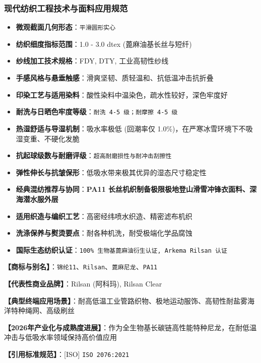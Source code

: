 \documentclass[11pt,openright,twoside,UTF8]{ctexbook}
\begin{document}
\subsubsection*{现代纺织工程技术与面料应用规范}
\begin{itemize} \setlength{\itemsep}{2pt}
    \item \textbf{微观截面几何形态}：\texttt{平滑圆形实心}
    \item \textbf{纺织细度指标范围}：1.0 - 3.0 dtex (蓖麻油基长丝与短纤)
    \item \textbf{纱线加工技术规格}：FDY, DTY, 工业高韧性纱线
    \item \textbf{手感风格与悬垂触感}：滑爽坚韧、质轻温和、抗低温冲击抗折叠
    \item \textbf{印染工艺与适用染料}：酸性染料中温染色，疏水性较好，深色牢度好
    \item \textbf{耐洗与日晒色牢度等级}：\texttt{耐洗 4-5 级；耐摩擦 4-5 级}
    \item \textbf{热湿舒适与导湿机制}：吸水率极低 (回潮率仅 1.0\%)，在严寒冰雪环境下不吸湿变重、不硬化发脆
    \item \textbf{抗起球级数与耐磨评级}：\texttt{超高耐磨损性与耐冲击刮擦性}
    \item \textbf{弹性伸长与抗皱保形}：低吸水带来极其优异的湿态尺寸稳定性
    \item \textbf{经典混纺推荐与协同}：\textbf{PA11 长丝机织制备极限极地登山滑雪冲锋衣面料、深海潜水服外层}
    \item \textbf{适用织造与编织工艺}：高密经纬喷水织造、精密滤布机织
    \item \textbf{洗涤保养与熨烫要点}：耐各种机洗，耐受极端化学品腐蚀
    \item \textbf{国际生态纺织认证}：\texttt{100\% 生物基蓖麻油衍生认证, Arkema Rilsan 认证}
\end{itemize}
\vspace{0.2cm}

\noindent\textbf{【商标与别名】}：\texttt{锦纶11}、\texttt{Rilsan}、\texttt{蓖麻尼龙}、\texttt{PA11}\par
\noindent\textbf{【代表性商业品牌】}：Rilsan (阿科玛), Rilsan Clear\par
\noindent\textbf{【典型终端应用场景】}：耐高低温工业管路织物、极地运动服饰、高韧性耐盐雾海洋特种绳网、高级刷丝\par
\noindent\textbf{【2026年产业化与成熟度进展】}：作为全生物基长碳链高性能特种尼龙，在耐低温冲击与低吸水率领域保持高价值应用\par
\noindent\textbf{【引用标准规范】}：[ISO] \texttt{ISO 2076:2021}\par
\vspace{0.5cm}
\end{document}
